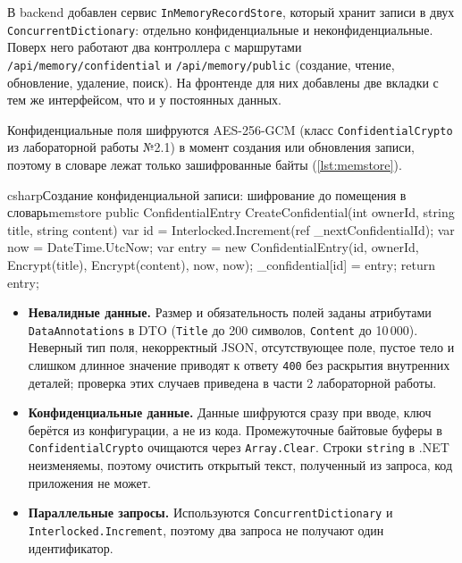 
В backend добавлен сервис \texttt{InMemoryRecordStore}, который хранит
записи в двух \texttt{ConcurrentDictionary}: отдельно конфиденциальные и
неконфиденциальные. Поверх него работают два контроллера с маршрутами
\texttt{/api/memory/confidential} и \texttt{/api/memory/public}
(создание, чтение, обновление, удаление, поиск). На фронтенде для них
добавлены две вкладки с тем же интерфейсом, что и у постоянных данных.

Конфиденциальные поля шифруются AES-256-GCM (класс
\texttt{ConfidentialCrypto} из лабораторной работы №2.1) в момент
создания или обновления записи, поэтому в словаре лежат только
зашифрованные байты (\autoref{lst:memstore}).

\begin{codelisting}[fontsize=\footnotesize]{csharp}{Создание конфиденциальной записи: шифрование до помещения в словарь}{memstore}
public ConfidentialEntry CreateConfidential(int ownerId, string title, string content)
{
    var id = Interlocked.Increment(ref _nextConfidentialId);
    var now = DateTime.UtcNow;
    var entry = new ConfidentialEntry(id, ownerId, Encrypt(title), Encrypt(content), now, now);
    _confidential[id] = entry;
    return entry;
}
\end{codelisting}


\begin{itemize}
  \item \textbf{Невалидные данные.} Размер и обязательность полей заданы
  атрибутами \texttt{DataAnnotations} в DTO (\texttt{Title} до 200
  символов, \texttt{Content} до 10\,000). Неверный тип поля,
  некорректный JSON, отсутствующее поле, пустое тело и слишком длинное
  значение приводят к ответу \texttt{400} без раскрытия внутренних
  деталей; проверка этих случаев приведена в части 2 лабораторной
  работы.
  \item \textbf{Конфиденциальные данные.} Данные шифруются сразу при
  вводе, ключ берётся из конфигурации, а не из кода. Промежуточные байтовые
  буферы в \texttt{ConfidentialCrypto} очищаются через
  \texttt{Array.Clear}. Строки \texttt{string} в .NET неизменяемы, поэтому
  очистить открытый текст, полученный из запроса, код приложения не может.
  \item \textbf{Параллельные запросы.} Используются
  \texttt{ConcurrentDictionary} и \texttt{Interlocked.Increment}, поэтому
  два запроса не получают один идентификатор.
\end{itemize}

